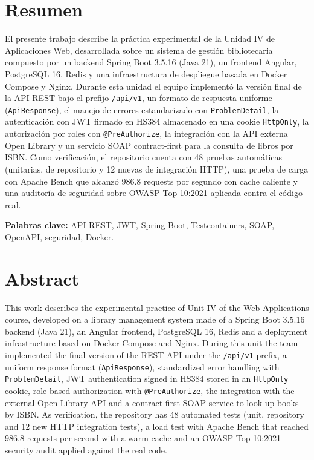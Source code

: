 \documentclass[12pt,a4paper]{article}
\begin{document}
\tableofcontents
\newpage

\section*{Resumen}

El presente trabajo describe la práctica experimental de la Unidad IV de Aplicaciones
Web, desarrollada sobre un sistema de gestión bibliotecaria compuesto por un backend
Spring Boot 3.5.16 (Java 21), un frontend Angular, PostgreSQL 16, Redis y una
infraestructura de despliegue basada en Docker Compose y Nginx. Durante esta unidad el
equipo implementó la versión final de la API REST bajo el prefijo \texttt{/api/v1}, un
formato de respuesta uniforme (\texttt{ApiResponse}), el manejo de errores estandarizado
con \texttt{ProblemDetail}, la autenticación con JWT firmado en HS384 almacenado en una
cookie \texttt{HttpOnly}, la autorización por roles con \texttt{@PreAuthorize}, la
integración con la API externa Open Library y un servicio SOAP contract-first para la
consulta de libros por ISBN. Como verificación, el repositorio cuenta con 48 pruebas
automáticas (unitarias, de repositorio y 12 nuevas de integración HTTP), una prueba de
carga con Apache Bench que alcanzó 986.8 requests por segundo con cache caliente y una
auditoría de seguridad sobre OWASP Top 10:2021 aplicada contra el código real.

\textbf{Palabras clave:} API REST, JWT, Spring Boot, Testcontainers, SOAP, OpenAPI,
seguridad, Docker.

\section*{Abstract}

This work describes the experimental practice of Unit IV of the Web Applications
course, developed on a library management system made of a Spring Boot 3.5.16 backend
(Java 21), an Angular frontend, PostgreSQL 16, Redis and a deployment infrastructure
based on Docker Compose and Nginx. During this unit the team implemented the final
version of the REST API under the \texttt{/api/v1} prefix, a uniform response format
(\texttt{ApiResponse}), standardized error handling with \texttt{ProblemDetail}, JWT
authentication signed in HS384 stored in an \texttt{HttpOnly} cookie, role-based
authorization with \texttt{@PreAuthorize}, the integration with the external Open
Library API and a contract-first SOAP service to look up books by ISBN. As
verification, the repository has 48 automated tests (unit, repository and 12 new HTTP
integration tests), a load test with Apache Bench that reached 986.8 requests per
second with a warm cache and an OWASP Top 10:2021 security audit applied against the
real code.
\end{document}
